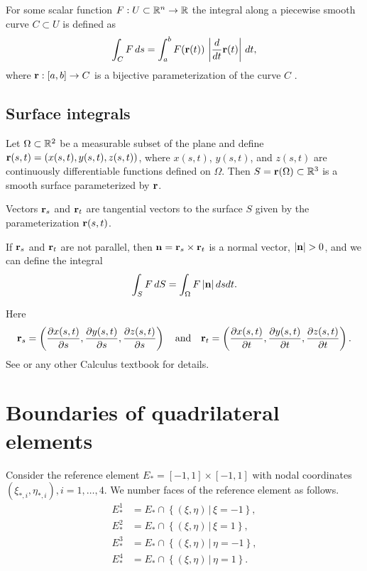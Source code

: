 \documentclass[11pt]{article}
\begin{document}
For some scalar function $F : U \subset \mathbb{R}^{n} \to \mathbb{R}$
the integral along a piecewise smooth curve $C \subset U$ is defined as
\begin{equation}
\label{eq:1}
\int_{C} F\, ds = \int_{a}^{b} F(\mathbf{r}(t))\, \left| \frac{d}{dt}\mathbf{r}(t) \right|\, dt,
\end{equation}
where $\mathbf{r}: [a, b] \to C$ is a bijective parameterization of the curve
$C$ \cite{Nikolsky1977}.

\subsection{Surface integrals}
\label{sec-2-2}

Let $\Omega \subset \mathbb{R}^{2}$ be a measurable subset of the
plane and define $\mathbf{r}(s,t) = (x(s,t), y(s,t), z(s,t))$, where $x(s,
t)$, $y(s, t)$, and $z(s, t)$ are continuously differentiable
functions defined on $\Omega$. Then $S = \mathbf{r}(\Omega) \subset
\mathbb{R}^{3}$ is a smooth surface parameterized by $\mathbf{r}$.

Vectors $\mathbf{r}_{s}$ and $\mathbf{r}_{t}$ are tangential vectors to the surface $S$
given by the parameterization $\mathbf{r}(s,t)$.

If $\mathbf{r}_{s}$ and $\mathbf{r}_{t}$ are not parallel, then $\mathbf{n} = \mathbf{r}_{s} \times \mathbf{r}_{t}$ is
a normal vector, $| \mathbf{n} | > 0$, and we can define
the integral
\begin{equation}
\label{eq:2}
\int_{S} F\, dS = \int_{\Omega} F\, |\mathbf{n}|\, ds dt.
\end{equation}

Here
\begin{equation}
\label{eq:3}
\mathbf{r}_{s} = \left(\frac{\partial x(s,t)}{\partial s}, \frac{\partial y(s,t)}{\partial s}, \frac{\partial z(s,t)}{\partial s}\right) \quad \text{and} \quad
\mathbf{r}_{t} = \left(\frac{\partial x(s,t)}{\partial t}, \frac{\partial y(s,t)}{\partial t}, \frac{\partial z(s,t)}{\partial t}\right).
\end{equation}
See \cite{Nikolsky1977} or any other Calculus textbook for details.


\section{Boundaries of quadrilateral elements}
\label{sec-3}
\newcommand{\F}[2]{#1_{#2}^{1}}
\newcommand{\Fk}[1]{\F{#1}{k}}
\newcommand{\Fr}[1]{\F{#1}{*}}
\newcommand{\T}{\Fr{\R}(t)}
\newcommand{\Tq}{\Fr{\R}(t_{q})}
\newcommand{\Tkq}{\Fk{\R}(t_{q})}

Consider the reference element $E_{*} = [-1, 1] \times [-1,1]$ with nodal coordinates
$(\xi_{*,i}, \eta_{*,i}), i=1,\dots,4$.
We number faces of the reference element as follows.
\begin{equation}
\label{eq:4}
\begin{aligned}
E_{*}^{1} &=  E_{*} \cap \left \{ (\xi, \eta)\, |\, \xi = -1 \right \},\\
E_{*}^{2} &=  E_{*} \cap \left \{ (\xi, \eta)\, |\, \xi = 1  \right \},\\
E_{*}^{3} &=  E_{*} \cap \left \{ (\xi, \eta)\, |\, \eta = -1 \right \},\\
E_{*}^{4} &=  E_{*} \cap \left \{ (\xi, \eta)\, |\, \eta = 1  \right \}.
\end{aligned}
\end{equation}
\end{document}
